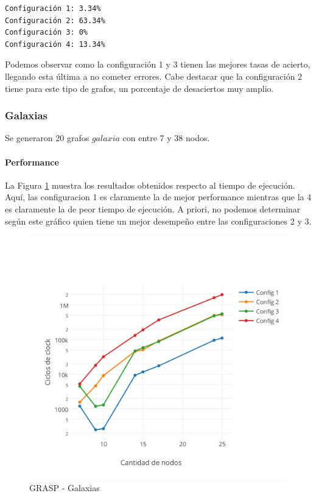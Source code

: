\begin{verbatim}
Configuración 1: 3.34%
Configuración 2: 63.34%
Configuración 3: 0%
Configuración 4: 13.34%
\end{verbatim}

Podemos observar como la configuración 1 y 3 tienen las mejores tasas de acierto, llegando esta última a no cometer errores. Cabe destacar que la configuración 2 tiene para este tipo de grafos, un porcentaje de desaciertos muy amplio.

\subsubsection{Galaxias}

Se generaron 20 grafos $galaxia$ con entre 7 y 38 nodos.

\paragraph{Performance}

La Figura \ref{fig:4C} muestra los resultados obtenidos respecto al tiempo de ejecución. Aquí, las configuracion 1 es claramente la de mejor performance mientras que la 4 es claramente la de peor tiempo de ejecución. A priori, no podemos determinar según este gráfico quien tiene un mejor desempeño entre las configuraciones 2 y 3. 

\begin{figure}[htb]
	\begin{center}
    		\includegraphics[scale=0.8]{imagenes/grasp-galaxias-tiempos.png}
	\end{center}
	\caption{GRASP - Galaxias}\label{fig:4C}
\end{figure}

